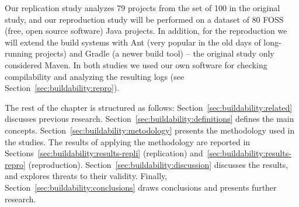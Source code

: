 Our replication study analyzes 79 projects from the set of 100 in the original study, and our reproduction study will be performed on a dataset of 80 FOSS (free, open source software) Java projects. In addition, for the reproduction we will extend the build systems with Ant (very popular in the old days of long-running projects) and Gradle (a newer build tool) -- the original study only considered Maven. In both studies we used our own software for checking compilability and analyzing the resulting logs (see Section~\ref{sec:buildability:repro}).












The rest of the chapter is structured as follows:
Section~\ref{sec:buildability:related} discusses previous research. 
Section~\ref{sec:buildability:definitions} defines the main concepts.
Section~\ref{sec:buildability:metodology} presents the methodology used in the studies. 
The results of applying the methodology are reported in Sections~\ref{sec:buildability:results-repli} (replication) and~\ref{sec:buildability:results-repro} (reproduction).
Section~\ref{sec:buildability:discussion} discusses the results, and explores threats to their validity.
Finally, Section~\ref{sec:buildability:conclusions} draws conclusions and presents further research.
